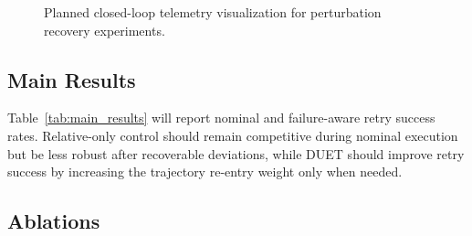 \documentclass[letterpaper, 10 pt, conference]{ieeeconf}
\begin{document}
\begin{figure}[t]
\centering
{}
\caption{Planned closed-loop telemetry visualization for perturbation recovery experiments.}
\label{fig:telemetry}
\end{figure}

\subsection{Main Results}

\begin{table}[t]
\caption{LIBERO nominal and failure-aware retry success rates. All quantitative entries are TODO placeholders and must be filled after evaluation.}
\label{tab:main_results}
\centering
{}
\end{table}

Table~\ref{tab:main_results} will report nominal and failure-aware retry success rates. Relative-only control should remain competitive during nominal execution but be less robust after recoverable deviations, while DUET should improve retry success by increasing the trajectory re-entry weight only when needed.

\subsection{Ablations}
\end{document}

